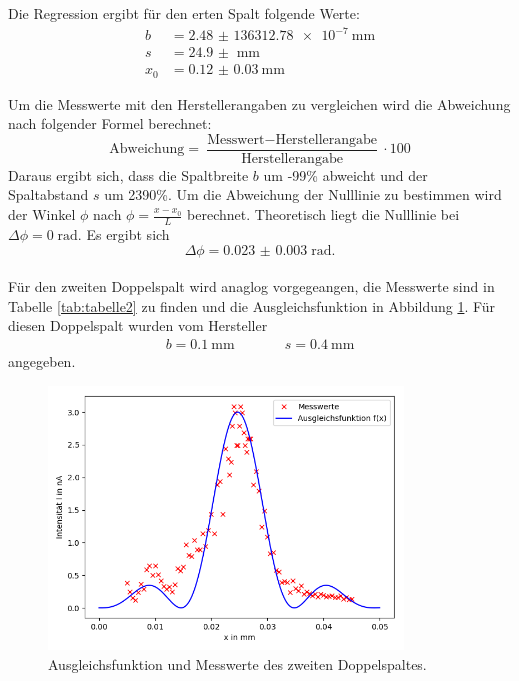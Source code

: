 Die Regression ergibt für den erten Spalt folgende Werte:
\begin{align*}
  b &=\SI{2.48(13631278)e-7}{\mm}\\
  s &=\SI{24.9(0)}{\mm}\\
  x_{0} &=\SI{0.12(3)}{\mm}
\end{align*}

Um die Messwerte mit den Herstellerangaben zu vergleichen wird die Abweichung nach folgender
Formel berechnet:
\begin{equation}
  \text{Abweichung}=\frac{\text{Messwert}-\text{Herstellerangabe}}{\text{Herstellerangabe}}\cdot100
\end{equation}
Daraus ergibt sich, dass die Spaltbreite $b$ um -99\% abweicht  %
und der Spaltabstand $s$ um 2390\%. Um die Abweichung der Nulllinie zu bestimmen wird
der Winkel $\phi$ nach $\phi=\frac{x-x_{0}}{L}$ berechnet. Theoretisch liegt die
Nulllinie bei $\Delta \phi=0\;\text{rad} $. Es ergibt sich
\begin{equation*}
  \Delta \phi =\SI{0.023(3)}\; \text{rad}.
\end{equation*}
\\
Für den zweiten Doppelspalt wird anaglog vorgegeangen, die Messwerte sind in Tabelle
\ref{tab:tabelle2} zu finden und die Ausgleichsfunktion in Abbildung \ref{fig:plot2}.
Für diesen Doppelspalt wurden vom Hersteller
\begin{align*}
  b=\SI{0,1}{\mm}  &\;\;\;\;\;\;\;\;\;\; s=\SI{0,4}{\mm}
\end{align*}
angegeben.


\begin{figure}
  \centering
  \includegraphics[height=7cm]{Figure_2.png}
  \caption{Ausgleichsfunktion und Messwerte des zweiten Doppelspaltes.}
  \label{fig:plot2}
\end{figure}

